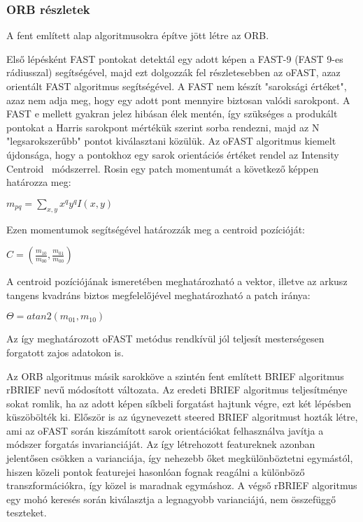 \subsubsection{ORB részletek}

A fent említett alap algoritmusokra építve jött létre az ORB.

Első lépésként FAST pontokat detektál egy adott képen a FAST-9 (FAST 9-es rádiusszal) segítségével, majd ezt dolgozzák fel részletesebben az oFAST, azaz orientált FAST algoritmus segítségével.
A FAST nem készít "saroksági értéket", azaz nem adja meg, hogy egy adott pont mennyire biztosan valódi sarokpont.
A FAST e mellett gyakran jelez hibásan élek mentén, így szükséges a produkált pontokat a Harris sarokpont mértékük szerint sorba rendezni, majd az N "legsarokszerűbb" pontot kiválasztani közülük.
Az oFAST algoritmus kiemelt újdonsága, hogy a pontokhoz egy sarok orientációs értéket rendel az Intensity Centroid~\cite{rosin1999measuring} módszerrel.
Rosin egy patch momentumát a következő képpen határozza meg:

$ m_{pq} = \sum_{x,y}^{}x^{q}y^{q}I(x,y) $

Ezen momentumok segítségével határozzák meg a centroid pozícióját:

$ C = (\frac{m_{10}}{m_{00}},\frac{m_{01}}{m_{00}}) $

A centroid pozíciójának ismeretében meghatározható a vektor, illetve az arkusz tangens kvadráns biztos megfelelőjével meghatározható a patch iránya:

$ \Theta = atan2(m_{01},m_{10}) $

Az így meghatározott oFAST metódus rendkívül jól teljesít mesterségesen forgatott zajos adatokon is.

Az ORB algoritmus másik sarokköve a szintén fent említett BRIEF algoritmus rBRIEF nevű módosított változata.
Az eredeti BRIEF algoritmus teljesítménye sokat romlik, ha az adott képen síkbeli forgatást hajtunk végre, ezt két lépésben küszöbölték ki.
Először is az úgynevezett steered BRIEF algoritmust hozták létre, ami az oFAST során kiszámított sarok orientációkat felhasználva javítja a módszer forgatás invarianciáját.
Az így létrehozott featureknek azonban jelentősen csökken a varianciája, így nehezebb őket megkülönböztetni egymástól, hiszen közeli pontok featurejei hasonlóan fognak reagálni a különböző transzformációkra, így közel is maradnak egymáshoz.
A végső rBRIEF algoritmus egy mohó keresés során kiválasztja a legnagyobb varianciájú, nem összefüggő teszteket.

